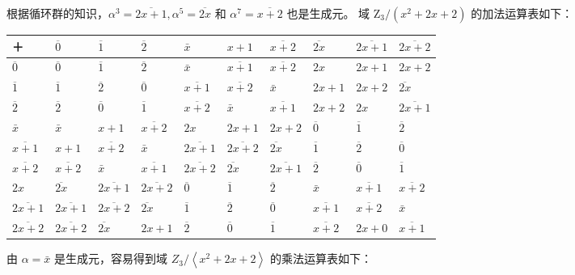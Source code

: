 \documentclass[UTF8, heading=true]{ctexart}
\begin{document}
根据循环群的知识，$\alpha^3=\overline{2 x+1}, \alpha^5=\overline{2 x}$ 和 $\alpha^7=\overline{x+2}$ 也是生成元。
域 $\mathrm{Z}_3 /\left(x^2+2 x+2\right)$ 的加法运算表如下：
\vspace{0.5cm}

\begin{tabular}{l||l|l|l|l|l|l|l|l|l}
\hline ＋ & $\overline{0}$ & $\overline{1}$ & $\overline{2}$ & $\bar{x}$ & $x+1$ & $\overline{x+2}$ & $\overline{2 x}$ & $\overline{2 x+1}$ & $\overline{2 x+2}$ \\
\hline $\overline{0}$ & $\overline{0}$ & $\overline{1}$ & $\overline{2}$ & $\bar{x}$ & $\overline{x+1}$ & $\overline{x+2}$ & $2 x$ & $2 x+1$ & $2 x+2$ \\
 $\overline{1}$ & $\overline{1}$ & $\overline{2}$ & $\overline{0}$ & $\overline{x+1}$ & $\overline{x+2}$ & $\bar{x}$ & $2 x+1$ & $2 x+2$ & $\overline{2 x}$ \\
 $\overline{2}$ & $\overline{2}$ & $\overline{0}$ & $\overline{1}$ & $\overline{x+2}$ & $\bar{x}$ & $\overline{x+1}$ & $2 x+2$ & $2 x$ & $\overline{2 x+1}$ \\
 $\bar{x}$ & $\bar{x}$ & $x+1$ & $\overline{x+2}$ & $2 x$ & $2 x+1$ & $2 x+2$ & $\overline{0}$ & $\overline{1}$ & $\overline{2}$ \\
 $\overline{x+1}$ & $x+1$ & $\overline{x+2}$ & $\bar{x}$ & $\overline{2 x+1}$ & $\overline{2 x+2}$ & $\overline{2 x}$ & $\overline{1}$ & $\overline{2}$ & $\overline{0}$ \\
 $\overline{x+2}$ & $\overline{x+2}$ & $\bar{x}$ & $\overline{x+1}$ & $\overline{2 x+2}$ & $\overline{2 x}$ & $\overline{2 x+1}$ & $\overline{2}$ & $\overline{0}$ & $\overline{1}$ \\
 $2 x$ & $\overline{2 x}$ & $\overline{2 x+1}$ & $\overline{2 x+2}$ & $\overline{0}$ & $\overline{1}$ & $\overline{2}$ & $\bar{x}$ & $\overline{x+1}$ & $\overline{x+2}$ \\
 $\overline{2 x+1}$ & $\overline{2 x+1}$ & $\overline{2 x+2}$ & $\overline{2 x}$ & $\overline{1}$ & $\overline{2}$ & $\overline{0}$ & $\overline{x+1}$ & $\overline{x+2}$ & $\bar{x}$ \\
 $\overline{2 x+2}$ & $\overline{2 x+2}$ & $\overline{2 x}$ & $2 x+1$ & $\overline{2}$ & $\overline{0}$ & $\overline{1}$ & $\overline{x+2}$ & $2 x+0$ & $\overline{x+1}$ \\
\hline
\end{tabular}

\vspace{0.5cm}

由 $\alpha=\bar{x}$ 是生成元，容易得到域 $Z_3 /\left\langle x^2+2 x+2\right\rangle$ 的乘法运算表如下：
\vspace{0.5cm}
\end{document}
